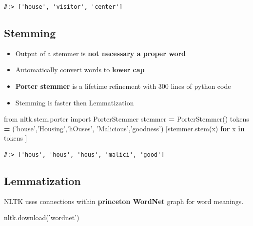 \documentclass[
]{book}
\newenvironment{Shaded}{\begin{snugshade}}{\end{snugshade}}
\newcommand{\ControlFlowTok}[1]{\textcolor[rgb]{0.27,0.27,0.27}{\textbf{#1}}}
\newcommand{\ImportTok}[1]{#1}
\newcommand{\KeywordTok}[1]{\textcolor[rgb]{0.27,0.27,0.27}{\textbf{#1}}}
\newcommand{\NormalTok}[1]{#1}
\newcommand{\OperatorTok}[1]{\textcolor[rgb]{0.43,0.43,0.43}{\textbf{#1}}}
\newcommand{\StringTok}[1]{\textcolor[rgb]{0.5,0.5,0.5}{#1}}
\providecommand{\tightlist}{%
  \setlength{\itemsep}{0pt}\setlength{\parskip}{0pt}}
\begin{document}
\begin{verbatim}
#:> ['house', 'visitor', 'center']
\end{verbatim}

\hypertarget{stemming}{%
\subsection{Stemming}\label{stemming}}

\begin{itemize}
\tightlist
\item
  Output of a stemmer is \textbf{not necessary a proper word}
\item
  Automatically convert words to \textbf{lower cap}
\item
  \textbf{Porter stemmer} is a lifetime refinement with 300 lines of python code\\
\item
  Stemming is faster then Lemmatization
\end{itemize}

\begin{Shaded}
\begin{Highlighting}[]
\ImportTok{from}\NormalTok{ nltk.stem.porter }\ImportTok{import}\NormalTok{ PorterStemmer}
\NormalTok{stemmer }\OperatorTok{=}\NormalTok{ PorterStemmer()}
\NormalTok{tokens }\OperatorTok{=}\NormalTok{ (}\StringTok{'house'}\NormalTok{,}\StringTok{'Housing'}\NormalTok{,}\StringTok{'hOuses'}\NormalTok{, }\StringTok{'Malicious'}\NormalTok{,}\StringTok{'goodness'}\NormalTok{)}
\NormalTok{[stemmer.stem(x) }\ControlFlowTok{for}\NormalTok{ x }\KeywordTok{in}\NormalTok{ tokens ]}
\end{Highlighting}
\end{Shaded}

\begin{verbatim}
#:> ['hous', 'hous', 'hous', 'malici', 'good']
\end{verbatim}

\hypertarget{lemmatization}{%
\subsection{Lemmatization}\label{lemmatization}}

NLTK uses connections within \textbf{princeton WordNet} graph for word meanings.

\begin{Shaded}
\begin{Highlighting}[]
\NormalTok{nltk.download(}\StringTok{'wordnet'}\NormalTok{)}
\end{Highlighting}
\end{Shaded}
\end{document}
